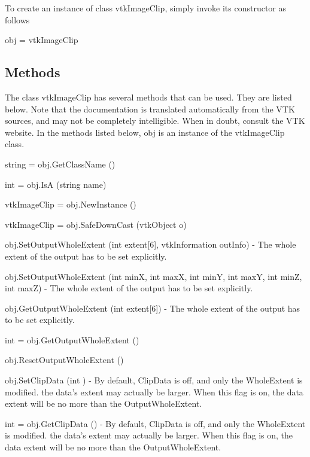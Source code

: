 To create an instance of class vtk\-Image\-Clip, simply invoke its constructor as follows \begin{DoxyVerb}  obj = vtkImageClip
\end{DoxyVerb}
 \hypertarget{vtkwidgets_vtkxyplotwidget_Methods}{}\subsection{Methods}\label{vtkwidgets_vtkxyplotwidget_Methods}
The class vtk\-Image\-Clip has several methods that can be used. They are listed below. Note that the documentation is translated automatically from the V\-T\-K sources, and may not be completely intelligible. When in doubt, consult the V\-T\-K website. In the methods listed below, {\ttfamily obj} is an instance of the vtk\-Image\-Clip class. 
\begin{DoxyItemize}
\item {\ttfamily string = obj.\-Get\-Class\-Name ()}  
\item {\ttfamily int = obj.\-Is\-A (string name)}  
\item {\ttfamily vtk\-Image\-Clip = obj.\-New\-Instance ()}  
\item {\ttfamily vtk\-Image\-Clip = obj.\-Safe\-Down\-Cast (vtk\-Object o)}  
\item {\ttfamily obj.\-Set\-Output\-Whole\-Extent (int extent\mbox{[}6\mbox{]}, vtk\-Information out\-Info)} -\/ The whole extent of the output has to be set explicitly.  
\item {\ttfamily obj.\-Set\-Output\-Whole\-Extent (int min\-X, int max\-X, int min\-Y, int max\-Y, int min\-Z, int max\-Z)} -\/ The whole extent of the output has to be set explicitly.  
\item {\ttfamily obj.\-Get\-Output\-Whole\-Extent (int extent\mbox{[}6\mbox{]})} -\/ The whole extent of the output has to be set explicitly.  
\item {\ttfamily int = obj.\-Get\-Output\-Whole\-Extent ()}  
\item {\ttfamily obj.\-Reset\-Output\-Whole\-Extent ()}  
\item {\ttfamily obj.\-Set\-Clip\-Data (int )} -\/ By default, Clip\-Data is off, and only the Whole\-Extent is modified. the data's extent may actually be larger. When this flag is on, the data extent will be no more than the Output\-Whole\-Extent.  
\item {\ttfamily int = obj.\-Get\-Clip\-Data ()} -\/ By default, Clip\-Data is off, and only the Whole\-Extent is modified. the data's extent may actually be larger. When this flag is on, the data extent will be no more than the Output\-Whole\-Extent.  

\end{DoxyItemize}
